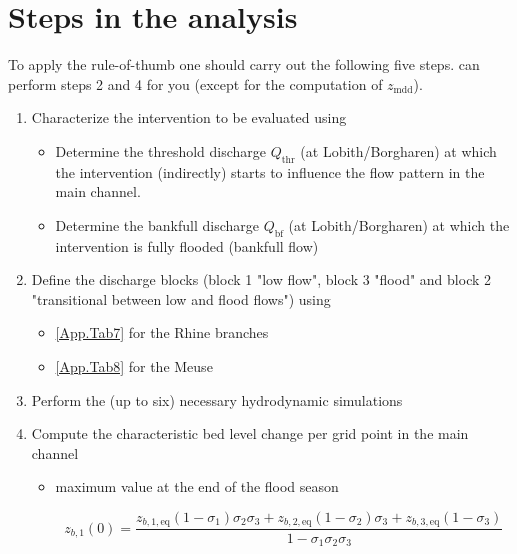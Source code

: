 \section{Steps in the analysis}

To apply the rule-of-thumb one should carry out the following five steps.
\dfastmi can perform steps 2 and 4 for you (except for the computation of $z_\text{mdd}$).

\begin{enumerate}
\item Characterize the intervention to be evaluated using \dfastmi

\begin{itemize}
\item Determine the threshold discharge $Q_\text{thr}$ (at Lobith/Borgharen) at which the intervention (indirectly) starts to influence the flow pattern in the main channel.

\item Determine the bankfull discharge $Q_\text{bf}$ (at Lobith/Borgharen) at which the intervention is fully flooded (bankfull flow)
\end{itemize}

\item Define the discharge blocks (block 1 "low flow", block 3 "flood" and block 2 "transitional between low and flood flows") using

\begin{itemize}
\item \autoref{App.Tab7} for the Rhine branches
\item \autoref{App.Tab8} for the Meuse
\end{itemize}

\item Perform the (up to six) necessary hydrodynamic simulations

\item Compute the characteristic bed level change per grid point in the main channel

\begin{itemize}
\item maximum value  at the end of the flood season

\begin{equation}
z_{b,1}(0) = \frac{z_{b,1,\text{eq}} (1-\sigma_1) \sigma_2 \sigma_3 + z_{b,2,\text{eq}} (1-\sigma_2) \sigma_3 + z_{b,3,\text{eq}} (1-\sigma_3)}{1 - \sigma_1 \sigma_2 \sigma_3}
\end{equation}


\end{itemize}
\end{enumerate}
